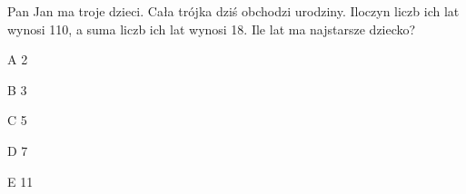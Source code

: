 \begin{tresc}
Pan Jan ma troje dzieci. Cała trójka dziś obchodzi urodziny. Iloczyn liczb ich lat wynosi 110, a suma liczb ich lat wynosi 18. Ile lat ma najstarsze dziecko?
\end{tresc}
\begin{wariant}{A} 2 \end{wariant}
\begin{wariant}{B} 3 \end{wariant}
\begin{wariant}{C} 5 \end{wariant}
\begin{wariant}{D} 7 \end{wariant}
\begin{wariant}{E} 11 \end{wariant}
